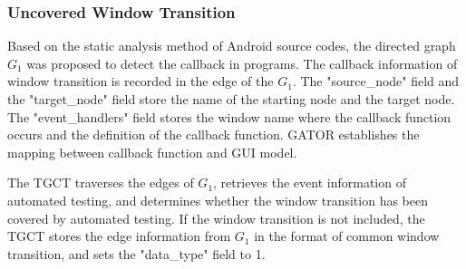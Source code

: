

\subsubsection{Uncovered Window Transition}
Based on the static analysis method of Android source codes, the directed graph $G_{1}$ was proposed to detect the callback in programs. The callback information of window transition is recorded in the edge of the $G_{1}$. The "source\_node" field and the "target\_node" field store the name of the starting node and the target node. The "event\_handlers" field stores the window name where the callback function occurs and the definition of the callback function. GATOR establishes the mapping between callback function and GUI model.

The TGCT traverses the edges of $G_{1}$, retrieves the event information of automated testing, and determines whether the window transition has been covered by automated testing. If the window transition is not included, the TGCT stores the edge information from $G_{1}$ in the format of common window transition, and sets the "data\_type" field to 1. 

